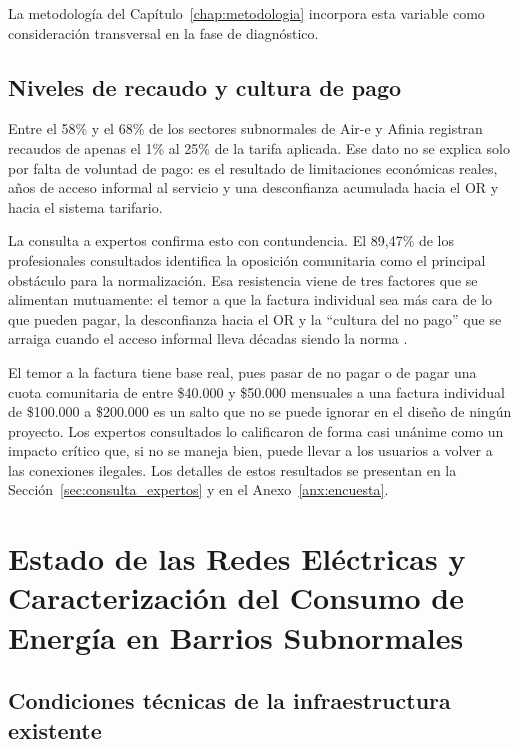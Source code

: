 La metodología del Capítulo~\ref{chap:metodologia} incorpora esta variable como consideración transversal en la fase de diagnóstico.

\subsection{Niveles de recaudo y cultura de pago}
\label{subsec:recaudo}

Entre el 58\% y el 68\% de los sectores subnormales de Air-e y Afinia registran recaudos de apenas el 1\% al 25\% de la tarifa aplicada. Ese dato no se explica solo por falta de voluntad de pago: es el resultado de limitaciones económicas reales, años de acceso informal al servicio y una desconfianza acumulada hacia el OR y hacia el sistema tarifario.

La consulta a expertos confirma esto con contundencia. El 89,47\% de los profesionales consultados identifica la oposición comunitaria como el principal obstáculo para la normalización. Esa resistencia viene de tres factores que se alimentan mutuamente: el temor a que la factura individual sea más cara de lo que pueden pagar, la desconfianza hacia el OR y la ``cultura del no pago'' que se arraiga cuando el acceso informal lleva décadas siendo la norma \parencite{SerranoRueda2019}.

El temor a la factura tiene base real, pues pasar de no pagar o de pagar una cuota comunitaria de entre \$40.000 y \$50.000 mensuales a una factura individual de \$100.000 a \$200.000 es un salto que no se puede ignorar en el diseño de ningún proyecto. Los expertos consultados lo calificaron de forma casi unánime como un impacto crítico que, si no se maneja bien, puede llevar a los usuarios a volver a las conexiones ilegales. Los detalles de estos resultados se presentan en la Sección~\ref{sec:consulta_expertos} y en el Anexo~\ref{anx:encuesta}.


\section{Estado de las Redes Eléctricas y Caracterización del Consumo de Energía en Barrios Subnormales}
\label{sec:redes_consumo}

\subsection{Condiciones técnicas de la infraestructura existente}
\label{subsec:infraestructura}

